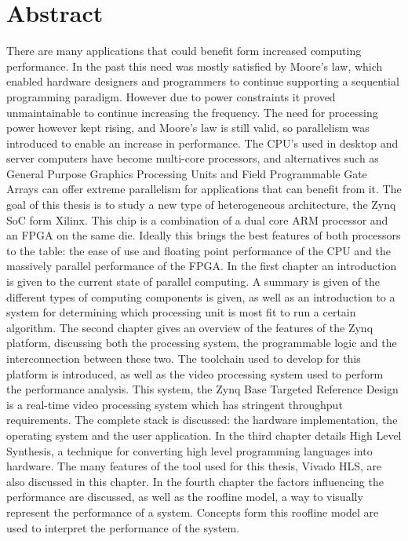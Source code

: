 

\chapter*{Abstract}

There are many applications that could benefit form increased computing performance. In the past this need was mostly satisfied by Moore's law, which enabled hardware designers and programmers to continue supporting a sequential programming paradigm. However due to power constraints it proved unmaintainable to continue increasing the frequency. The need for processing power however kept rising, and Moore's law is still valid, so parallelism was introduced to enable an increase in performance. The CPU's used in desktop and server computers have become multi-core processors, and alternatives such as General Purpose Graphics Processing Units and Field Programmable Gate Arrays can offer extreme parallelism for applications that can benefit from it. The goal of this thesis is to study a new type of heterogeneous architecture, the Zynq SoC form Xilinx. This chip is a combination of a dual core ARM processor and an FPGA on the same die. Ideally this brings the best features of both processors to the table: the ease of use and floating point performance of the CPU and the massively parallel performance of the FPGA. In the first chapter an introduction is given to the current state of parallel computing. A summary is given of the different types of computing components is given, as well as an introduction to a system for determining which processing unit is most fit to run a certain algorithm. The second chapter gives an overview of the features of the Zynq platform, discussing both the processing system, the programmable logic and the interconnection between these two. The toolchain used to develop for this platform is introduced, as well as the video processing system used to perform the performance analysis. This system, the Zynq Base Targeted Reference Design is a real-time video processing system which has stringent throughput requirements. The complete stack is discussed: the hardware implementation, the operating system and the user application. In the third chapter details High Level Synthesis, a technique for converting high level programming languages into hardware. The many features of the tool used for this thesis, Vivado HLS, are also discussed in this chapter. In the fourth chapter the factors influencing the performance are discussed, as well as the roofline model, a way to visually represent the performance of a system. Concepts form this roofline model are used to interpret the performance of the system.